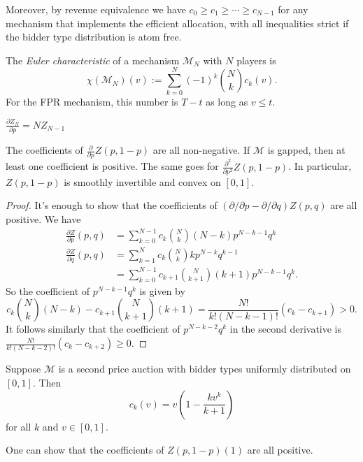 Moreover, by revenue equivalence we have $c_0 \geq c_1 \geq \cdots \geq c_{N-1}$ for any mechanism that implements the efficient allocation, with all inequalities strict if the bidder type distribution is atom free.


\begin{definition}

  The \emph{Euler characteristic} of a mechanism $\mathcal{M}_N$ with $N$ players is
  \[
    \chi(\mathcal{M}_N)(v) := \sum_{k=0}^{N} (-1)^k { N \choose k } c_k(v).
  \]
  For the FPR mechanism, this number is $T-t$ as long as $v\leq t$.

\end{definition}

\begin{lemma} $\frac{\partial Z_N}{\partial p} = NZ_{N-1}$ \end{lemma}

\begin{lemma}

  The coefficients of $\frac{\partial}{\partial p}Z(p,1-p)$ are all non-negative.
  If $\mathcal{M}$ is gapped, then at least one coefficient is positive.
  The same goes for $\frac{\partial^2}{\partial p^2}Z(p,1-p)$.
  In particular, $Z(p,1-p)$ is smoothly invertible and convex on $[0,1]$.

\end{lemma}
%
\begin{proof}

  It's enough to show that the coefficients of $(\partial/\partial p - \partial/\partial q)Z(p,q)$ are all positive.
  We have
  \begin{align*}
    \frac{\partial Z}{\partial p}(p,q) &= \sum_{k=0}^{N-1} c_k {N \choose k}(N-k)p^{N-k-1}q^k \\
    \frac{\partial Z}{\partial q}(p,q) &= \sum_{k=1}^N c_k {N \choose k}kp^{N-k}q^{k-1} \\
    &= \sum_{k=0}^{N-1} c_{k+1} {N \choose k+1}(k+1) p^{N-k-1}q^{k}.
  \end{align*}
  So the coefficient of $p^{N-k-1}q^k$ is given by
  \[
    c_k {N\choose k}(N-k) - c_{k+1} {N\choose k+1}  (k+1) =  \frac{N!}{k!(N-k-1)!} (c_k-c_{k+1}) > 0. 
  \]
  It follows similarly that the coefficient of $p^{N-k-2}q^k$ in the second derivative is $\frac{N!}{k!(N-k-2)!}(c_k-c_{k+2})\geq 0$.

\end{proof}

\begin{example}

  Suppose $\mathcal{M}$ is a second price auction with bidder types uniformly distributed on $[0,1]$.
  Then 
  \[
    c_k(v) = v \left( 1 - \frac{kv^k}{k+1} \right)
  \]
  for all $k$ and $v\in[0,1]$.
  
  One can show that the coefficients of $Z(p,1-p)(1)$ are all positive.

\end{example}

